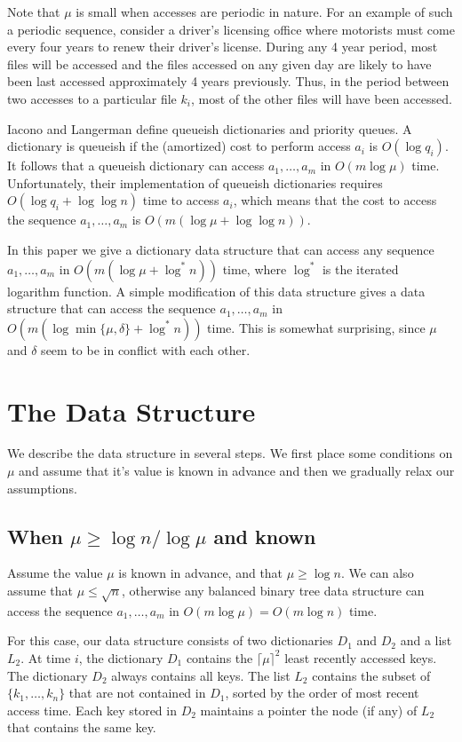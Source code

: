 \documentclass[lotsofwhite,ccfonts]{patmorin}
\begin{document}
Note that $\mu$ is small when accesses are periodic in nature.  For an
example of such a periodic sequence, consider a driver's licensing
office where motorists must come every four years to renew their
driver's license.  During any 4 year period, most files will be
accessed and the files accessed on any given day are likely to have
been last accessed approximately 4 years previously.  Thus, in the
period between two accesses to a particular file $k_i$, most of the
other files will have been accessed.

Iacono and Langerman \cite{il02} define queueish dictionaries and
priority queues.  A dictionary is queueish if the (amortized) cost to
perform access $a_i$ is $O(\log q_i)$.  It follows that a queueish
dictionary can access $a_1,\ldots,a_m$ in $O(m\log\mu)$ time.
Unfortunately, their implementation of queueish dictionaries requires
$O(\log q_i+\log\log n)$ time to access $a_i$, which means that the
cost to access the sequence $a_1,\ldots,a_m$ is $O(m(\log\mu +
\log\log n))$.

In this paper we give a dictionary data structure that can access any
sequence $a_1,\ldots,a_m$ in $O(m(\log\mu +\log^* n))$ time, where
$\log^*$ is the iterated logarithm function.  A simple modification of
this data structure gives a data structure that can access the
sequence $a_1,\ldots,a_m$ in $O(m(\log\min\{\mu,\delta\} + \log^*n))$
time.  This is somewhat surprising, since $\mu$ and $\delta$ seem to
be in conflict with each other.

\section{The Data Structure}

We describe the data structure in several steps.  We first place some
conditions on $\mu$ and assume that it's value is known in advance and
then we gradually relax our assumptions.


\subsection{When $\mu \ge \log n/\log \mu$ and known}

Assume the value $\mu$ is known in advance, and that $\mu\ge \log n$.
We can also assume that $\mu\le \sqrt{n}$, otherwise any balanced
binary tree data structure can access the sequence $a_1,\ldots,a_m$ in
$O(m\log \mu)=O(m\log n)$ time.

For this case, our data structure consists of two dictionaries $D_1$
and $D_2$ and a list $L_2$.  At time $i$, the dictionary $D_1$
contains the $\lceil\mu\rceil^2$ least recently accessed keys.  The
dictionary $D_2$ always contains all keys.  The list $L_2$ contains
the subset of $\{k_1,\ldots,k_n\}$ that are not contained in $D_1$,
sorted by the order of most recent access time.  Each key stored in
$D_2$ maintains a pointer the node (if any) of $L_2$ that contains the
same key.
\end{document}
